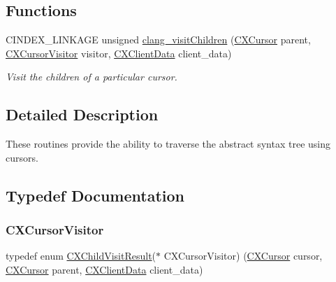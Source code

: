 \subsection*{Functions}
\begin{DoxyCompactItemize}
\item 
C\+I\+N\+D\+E\+X\+\_\+\+L\+I\+N\+K\+A\+GE unsigned \mbox{\hyperlink{group__CINDEX__CURSOR__TRAVERSAL_ga5d0a813d937e1a7dcc35f206ad1f7a91}{clang\+\_\+visit\+Children}} (\mbox{\hyperlink{structCXCursor}{C\+X\+Cursor}} parent, \mbox{\hyperlink{group__CINDEX__CURSOR__TRAVERSAL_gabf842c9ee20048b596eb9dfe94bb1570}{C\+X\+Cursor\+Visitor}} visitor, \mbox{\hyperlink{group__CINDEX_gacfa40c3de26d228c0d898403c2c21612}{C\+X\+Client\+Data}} client\+\_\+data)
\begin{DoxyCompactList}\small\item\em Visit the children of a particular cursor. \end{DoxyCompactList}\end{DoxyCompactItemize}


\subsection{Detailed Description}
These routines provide the ability to traverse the abstract syntax tree using cursors. 

\subsection{Typedef Documentation}
\mbox{\label{group__CINDEX__CURSOR__TRAVERSAL_gabf842c9ee20048b596eb9dfe94bb1570}} 
\subsubsection{\texorpdfstring{C\+X\+Cursor\+Visitor}{CXCursorVisitor}}
{\footnotesize\ttfamily typedef enum \mbox{\hyperlink{group__CINDEX__CURSOR__TRAVERSAL_ga99a9058656e696b622fbefaf5207d715}{C\+X\+Child\+Visit\+Result}}($\ast$ C\+X\+Cursor\+Visitor) (\mbox{\hyperlink{structCXCursor}{C\+X\+Cursor}} cursor, \mbox{\hyperlink{structCXCursor}{C\+X\+Cursor}} parent, \mbox{\hyperlink{group__CINDEX_gacfa40c3de26d228c0d898403c2c21612}{C\+X\+Client\+Data}} client\+\_\+data)}



